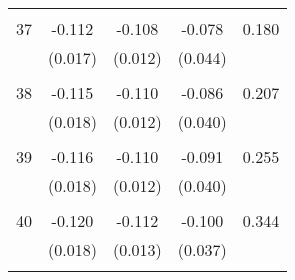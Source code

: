 \begin{tabular}{l*{1}{cccc}}
 & & & &\\
  37       & -0.112 & -0.108 & -0.078 & 0.180 \\
          & (0.017) & (0.012) & (0.044) & \\
 & & & &\\
  38       & -0.115 & -0.110 & -0.086 & 0.207 \\
          & (0.018) & (0.012) & (0.040) & \\
 & & & &\\
  39       & -0.116 & -0.110 & -0.091 & 0.255 \\
          & (0.018) & (0.012) & (0.040) & \\
 & & & &\\
  40       & -0.120 & -0.112 & -0.100 & 0.344 \\
          & (0.018) & (0.013) & (0.037) & \\
 & & & &\\
\hline\hline
\end{tabular}
